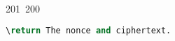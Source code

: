 201~200~\documentclass{article}
\begin{document}
\begin{lstlisting}[language=Python, caption=Encrypting a Message with ChaCha20-Poly1305]
	                                                                                                                                                                                                                                                                                                	                                                                                                                                        	    	                                                                                                	                                                                                                                                                                                                                                                                                                                                	                                                                        	                                                                        	                                                                                                                                        	                                                                                                                                                                                                                        	                                                                                                                            	                                                                	                                                                                                                        \return The nonce and ciphertext.

\end{lstlisting}
\end{document}
